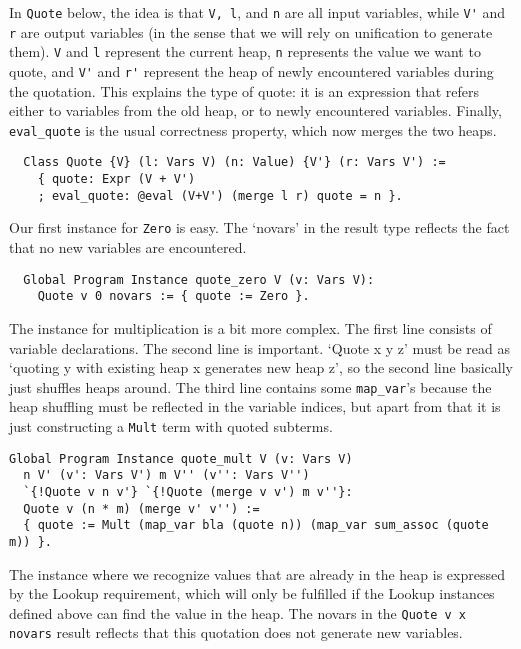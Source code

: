 \documentclass[a4paper,10pt,runningheads]{llncs}
\begin{document}
In \lstinline|Quote| below, the idea is that \lstinline|V, l|, and \lstinline|n| are all input variables, while \lstinline|V'| and \lstinline|r| are
output variables (in the sense that we will rely on unification to generate them). \lstinline|V| and \lstinline|l|
represent the current heap, \lstinline|n| represents the value we want to quote, and \lstinline|V'| and \lstinline|r'| represent
the heap of newly encountered variables during the quotation.
  This explains the type of quote: it is an expression that refers either to variables from
the old heap, or to newly encountered variables. Finally, \lstinline|eval_quote| is the usual correctness property, which now merges the two heaps.

\begin{lstlisting}
  Class Quote {V} (l: Vars V) (n: Value) {V'} (r: Vars V') :=
    { quote: Expr (V + V')
    ; eval_quote: @eval (V+V') (merge l r) quote = n }.
\end{lstlisting}


Our first instance for \lstinline|Zero| is easy. The `novars' in the result type reflects the fact that no
new variables are encountered.
\begin{lstlisting}
  Global Program Instance quote_zero V (v: Vars V):
    Quote v 0 novars := { quote := Zero }.
\end{lstlisting}


The instance for multiplication is a bit more complex. The first line consists of
 variable declarations. The second line is important. `Quote x y z' must be read as
 `quoting y with existing heap x generates new heap z', so the second line basically just
shuffles heaps around.
 The third line contains some \lstinline|map_var|'s because the heap shuffling must be
reflected in the variable indices, but apart from that it is just constructing a \lstinline|Mult| term with
quoted subterms.

\begin{lstlisting}
Global Program Instance quote_mult V (v: Vars V)
  n V' (v': Vars V') m V'' (v'': Vars V'')
  `{!Quote v n v'} `{!Quote (merge v v') m v''}:
  Quote v (n * m) (merge v' v'') :=
  { quote := Mult (map_var bla (quote n)) (map_var sum_assoc (quote m)) }.
\end{lstlisting}

The instance where we recognize values that are already in the heap is expressed by the Lookup requirement, which will only be fulfilled if the Lookup instances defined above can find the value in the heap. The novars in the \lstinline|Quote v x novars| result
   reflects that this quotation does not generate new variables.
\end{document}
